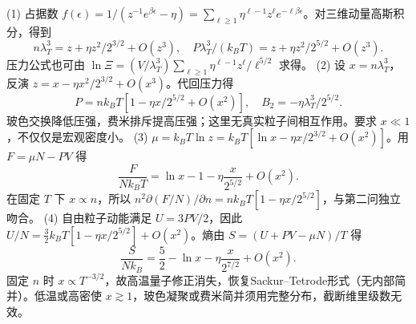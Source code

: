 (1) 占据数 \(f(\epsilon)=1/(z^{-1}e^{\beta\epsilon}-\eta)=\sum_{\ell\ge1}\eta^{\ell-1}z^\ell e^{-\ell\beta\epsilon}\)。对三维动量高斯积分，得到
\[
n\lambda_T^3=z+\eta z^2/2^{3/2}+O(z^3),\quad
P\lambda_T^3/(k_BT)=z+\eta z^2/2^{5/2}+O(z^3).
\]
压力公式也可由 \(\ln\Xi=(V/\lambda_T^3)\sum_{\ell\ge1}\eta^{\ell-1}z^\ell/\ell^{5/2}\) 求得。
(2) 设 \(x=n\lambda_T^3\)，反演 \(z=x-\eta x^2/2^{3/2}+O(x^3)\)。代回压力得
\[
P=nk_BT[1-\eta x/2^{5/2}+O(x^2)],\quad B_2=-\eta\lambda_T^3/2^{5/2}.
\]
玻色交换降低压强，费米排斥提高压强；这里无真实粒子间相互作用。要求 \(x\ll1\)，不仅仅是宏观密度小。
(3) \(\mu=k_BT\ln z=k_BT[\ln x-\eta x/2^{3/2}+O(x^2)]\)。用 \(F=\mu N-PV\) 得
\[
\frac F{Nk_BT}=\ln x-1-\eta\frac{x}{2^{5/2}}+O(x^2).
\]
在固定 \(T\) 下 \(x\propto n\)，所以 \(n^2\partial(F/N)/\partial n=nk_BT[1-\eta x/2^{5/2}]\)，与第二问独立吻合。
(4) 自由粒子动能满足 \(U=3PV/2\)，因此 \(U/N=\frac32k_BT[1-\eta x/2^{5/2}]+O(x^2)\)。熵由 \(S=(U+PV-\mu N)/T\) 得
\[
\frac S{Nk_B}=\frac52-\ln x-\eta\frac{x}{2^{7/2}}+O(x^2).
\]
固定 \(n\) 时 \(x\propto T^{-3/2}\)，故高温量子修正消失，恢复Sackur--Tetrode形式（无内部简并）。低温或高密使 \(x\gtrsim1\)，玻色凝聚或费米简并须用完整分布，截断维里级数无效。
